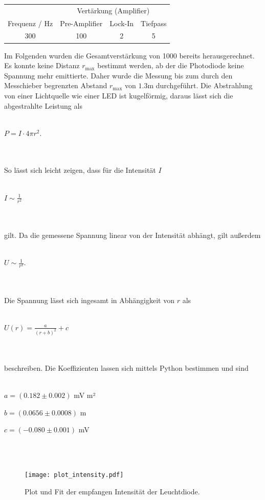 \begin{table}[!htp]
  \centering
  \begin{tabular}{cccc}
    \toprule
     & \multicolumn{3}{c}{Vertärkung (Amplifier)} \\
    Frequenz / Hz & Pre-Amplifier & Lock-In & Tiefpass \\
    \midrule
    300 & 100 & 2 & 5 \\
    \bottomrule
  \end{tabular}
\end{table}

Im Folgenden wurden die Gesamtverstärkung von 1000 bereits herausgerechnet. Es konnte keine Distanz $r_\text{max}$ bestimmt werden, ab der die Photodiode keine Spannung mehr emittierte. Daher wurde die Messung bis zum durch den Messchieber begrenzten Abstand $r_\text{max}$ von $1.3$m durchgeführt.
Die Abstrahlung von einer Lichtquelle wie einer LED ist kugelförmig, daraus lässt sich die abgestrahlte Leistung als
\\ \\
\centerline{$P = I\cdot 4\pi r^2$.}
\\ \\
So lässt sich leicht zeigen, dass für die Intensität $I$
\\ \\
\centerline{$I\sim \frac{1}{r^2}$}
\\ \\
gilt. Da die gemessene Spannung linear von der Intensität abhängt, gilt außerdem
\\ \\
\centerline{$U\sim \frac{1}{r^2}$.}
\\ \\
Die Spannung lässt sich ingesamt in Abhängigkeit von $r$ als
\\ \\
\centerline{$U(r) = \frac{a}{(r+b)^2} +c$}
\\ \\
beschreiben. Die Koeffizienten lassen sich mittels Python bestimmen und sind
\\ \\
\centerline{$a=(0.182\pm 0.002)$ \!mV m²}
\centerline{$b=(0.0656\pm 0.0008)$ \!m}
\centerline{$c=(-0.080\pm 0.001)$ \!mV}
\\ \\

\begin{figure}
  \centering
  \texttt{[image: plot\_intensity.pdf]}
  \caption{Plot und Fit der empfangen Intensität der Leuchtdiode.}
  \label{fig:plot_intensity}
\end{figure}